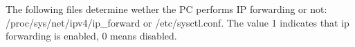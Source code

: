 The following files determine wether the PC performs IP forwarding or not: /proc/sys/net/ipv4/ip\_forward or /etc/sysctl.conf. The value 1 indicates that ip forwarding is enabled, 0 means disabled.